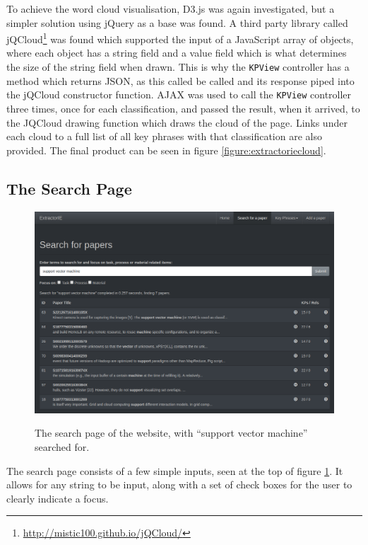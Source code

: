 To achieve the word cloud visualisation, D3.js was again investigated, but a simpler solution using jQuery as a base was found. A third party library called jQCloud\footnote{\href{http://mistic100.github.io/jQCloud/}{http://mistic100.github.io/jQCloud/}} was found which supported the input of a JavaScript array of objects, where each object has a string field and a value field which is what determines the size of the string field when drawn. This is why the \texttt{KPView} controller has a method which returns JSON, as this called be called and its response piped into the jQCloud constructor function. AJAX was used to call the \texttt{KPView} controller three times, once for each classification, and passed the result, when it arrived, to the JQCloud drawing function which draws the cloud of the page. Links under each cloud to a full list of all key phrases with that classification are also provided. The final product can be seen in figure \ref{figure:extractoriecloud}.

\subsection*{The Search Page}

\begin{figure}
	\centering
	\includegraphics[width=12cm]{img/extractorie-search-supportvectormachine.png} \\
	\caption[An Example Search on the Website]{The search page of the website, with ``support vector machine'' searched for.}
	\label{figure:extractoriesearch}
\end{figure}

The search page consists of a few simple inputs, seen at the top of figure \ref{figure:extractoriesearch}. It allows for any string to be input, along with a set of check boxes for the user to clearly indicate a focus.


